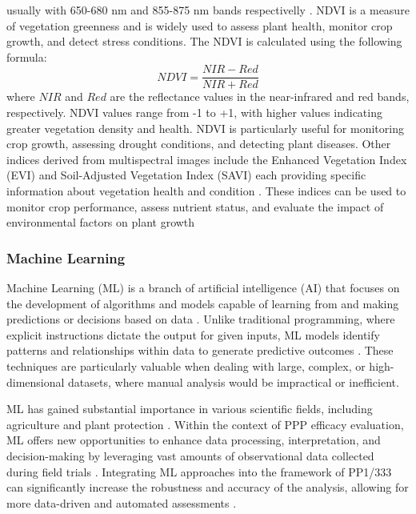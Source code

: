 \documentclass[12pt,a4paper,oneside]{report}
\begin{document}
usually with 650-680 nm and 855-875 nm bands respectivelly \cite{rouseMonitoringVegetationSystems1974,tuckerRedPhotographicInfrared1979}. 
NDVI is a measure of vegetation
greenness and is widely used to assess plant health, monitor crop growth, and
detect stress conditions. The NDVI is calculated using the following formula:
\[
NDVI = \frac{NIR - Red}{NIR + Red}
\]
where \(NIR\) and \(Red\) are the reflectance values in the near-infrared and red
bands, respectively. NDVI values range from -1 to +1, with higher values indicating
greater vegetation density and health. NDVI is particularly useful for monitoring
crop growth, assessing drought conditions, and detecting plant diseases.
Other indices derived from multispectral images include the Enhanced
Vegetation Index (EVI) and Soil-Adjusted Vegetation Index (SAVI) each providing 
specific information about vegetation health and condition
\cite{hueteOverviewRadiometricBiophysical2002,qiModifiedSoilAdjusted1994}. 
These indices can be used to monitor crop performance, assess
nutrient status, and evaluate the impact of environmental factors on plant
growth
\cite{jonesRemoteSensingVegetation2010,mahleinHyperspectralSensorsImaging2018}

\subsubsection{Machine Learning}

Machine Learning (ML) is a branch of artificial intelligence (AI) that 
focuses on the development of algorithms and models capable of learning 
from and making predictions or decisions based on data \cite{kozaAutomatedDesignBoth1996}. 
Unlike traditional 
programming, where explicit instructions dictate the output for given inputs, 
ML models identify patterns and relationships within data to generate 
predictive outcomes \cite{hastieElementsStatisticalLearning2009}. 
These techniques are particularly valuable when 
dealing with large, complex, or high-dimensional datasets, where manual 
analysis would be impractical or inefficient.

ML has gained substantial importance in various scientific fields, including 
agriculture \cite{araujoMachineLearningApplications2023} and 
plant protection \cite{bockVisualEstimatesFully2020}. 
Within the context of PPP 
efficacy evaluation, ML offers new opportunities to enhance data processing, 
interpretation, and decision-making by leveraging vast amounts of observational 
data collected during field trials \cite{bockSpecialIssuePhytopathometry2022}. Integrating ML approaches into the framework 
of PP1/333 can significantly increase the robustness and accuracy of the analysis, 
allowing for more data-driven and automated assessments 
\cite{barbedoAutomaticMethodDetect2014,arnalbarbedoDigitalImageProcessing2013,bockPlantDiseaseSeverity2010}.
\end{document}
